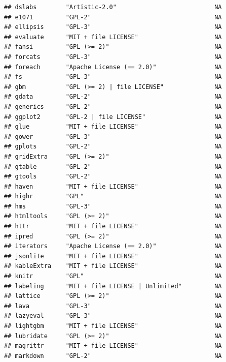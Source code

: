\documentclass[]{article}
\begin{document}
\begin{verbatim}
## dslabs        "Artistic-2.0"                           NA             
## e1071         "GPL-2"                                  NA             
## ellipsis      "GPL-3"                                  NA             
## evaluate      "MIT + file LICENSE"                     NA             
## fansi         "GPL (>= 2)"                             NA             
## forcats       "GPL-3"                                  NA             
## foreach       "Apache License (== 2.0)"                NA             
## fs            "GPL-3"                                  NA             
## gbm           "GPL (>= 2) | file LICENSE"              NA             
## gdata         "GPL-2"                                  NA             
## generics      "GPL-2"                                  NA             
## ggplot2       "GPL-2 | file LICENSE"                   NA             
## glue          "MIT + file LICENSE"                     NA             
## gower         "GPL-3"                                  NA             
## gplots        "GPL-2"                                  NA             
## gridExtra     "GPL (>= 2)"                             NA             
## gtable        "GPL-2"                                  NA             
## gtools        "GPL-2"                                  NA             
## haven         "MIT + file LICENSE"                     NA             
## highr         "GPL"                                    NA             
## hms           "GPL-3"                                  NA             
## htmltools     "GPL (>= 2)"                             NA             
## httr          "MIT + file LICENSE"                     NA             
## ipred         "GPL (>= 2)"                             NA             
## iterators     "Apache License (== 2.0)"                NA             
## jsonlite      "MIT + file LICENSE"                     NA             
## kableExtra    "MIT + file LICENSE"                     NA             
## knitr         "GPL"                                    NA             
## labeling      "MIT + file LICENSE | Unlimited"         NA             
## lattice       "GPL (>= 2)"                             NA             
## lava          "GPL-3"                                  NA             
## lazyeval      "GPL-3"                                  NA             
## lightgbm      "MIT + file LICENSE"                     NA             
## lubridate     "GPL (>= 2)"                             NA             
## magrittr      "MIT + file LICENSE"                     NA             
## markdown      "GPL-2"                                  NA             

\end{verbatim}
\end{document}
